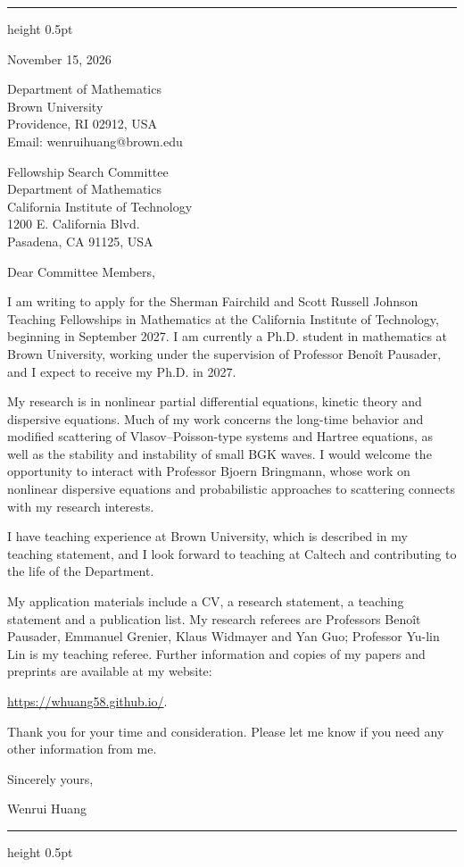 \documentclass[10pt]{article}
\begin{document}
\vspace{0.08in}
\hrule height 0.5pt

\vspace{0.47in}
\hfill
\begin{minipage}{2.27in}
November 15, 2026

\vspace{0.16in}
Department of Mathematics\\
Brown University\\
Providence, RI 02912, USA\\
Email: wenrui\textunderscore huang@brown.edu
\end{minipage}

\vspace{0.30in}
Fellowship Search Committee\\
Department of Mathematics\\
California Institute of Technology\\
1200 E. California Blvd.\\
Pasadena, CA 91125, USA

\vspace{0.16in}
Dear Committee Members,

I am writing to apply for the Sherman Fairchild and Scott Russell Johnson Teaching Fellowships in Mathematics at the California Institute of Technology, beginning in September 2027. I am currently a Ph.D. student in mathematics at Brown University, working under the supervision of Professor Beno\^{i}t Pausader, and I expect to receive my Ph.D. in 2027.

My research is in nonlinear partial differential equations, kinetic theory and dispersive equations. Much of my work concerns the long-time behavior and modified scattering of Vlasov--Poisson-type systems and Hartree equations, as well as the stability and instability of small BGK waves. I would welcome the opportunity to interact with Professor Bjoern Bringmann, whose work on nonlinear dispersive equations and probabilistic approaches to scattering connects with my research interests.

I have teaching experience at Brown University, which is described in my teaching statement, and I look forward to teaching at Caltech and contributing to the life of the Department.

My application materials include a CV, a research statement, a teaching statement and a publication list. My research referees are Professors Beno\^{i}t Pausader, Emmanuel Grenier, Klaus Widmayer and Yan Guo; Professor Yu-lin Lin is my teaching referee. Further information and copies of my papers and preprints are available at my website:

\url{https://whuang58.github.io/}.

\medskip
Thank you for your time and consideration. Please let me know if you need any other information from me.

\vspace{0.12in}
Sincerely yours,

\vspace{0.12in}
Wenrui Huang

\vfill
\hrule height 0.5pt
\end{document}
